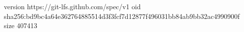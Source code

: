 version https://git-lfs.github.com/spec/v1
oid sha256:bd9bc4a64e362764885514d3f3fcf7d12877f496031bb84ab9bb32ac4990900f
size 407413
